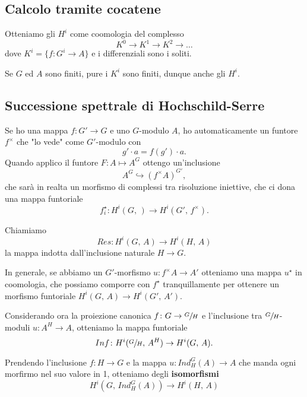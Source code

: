 \documentclass[a4paper]{article}
\begin{document}
	\subsection{Calcolo tramite cocatene}
	\begin{theorem}
		Otteniamo gli $ H^i $ come coomologia del complesso
		\[ K^0 \to K^1 \to K^2 \to \dots \]
		dove $ K^i = \{ f \colon G^i \to A \} $ e i differenziali sono i soliti.
	\end{theorem}

	\begin{theorem}
		Se $ G $ ed $ A $ sono finiti, pure i $ K^i $ sono finiti, dunque anche gli $ H^i. $
	\end{theorem}
	
	\subsection{Successione spettrale di Hochschild-Serre}
	Se ho una mappa $ f \colon G' \to G $ e uno $ G $-modulo $ A $, ho automaticamente un funtore $ f^\times $ che "lo vede" come $ G' $-modulo con
	\[ g' \cdot a = f(g') \cdot a. \]
	Quando applico il funtore $ F \colon A \mapsto A^G $ ottengo un'inclusione
	\[ A^G \hookrightarrow (f^\times A)^{G'}, \]
	che sarà in realta un morfismo di complessi tra risoluzione iniettive, che ci dona una mappa funtoriale $$  f_i^\star \colon H^i(G, \, ) \to H^i(G', \, f^\times ).  $$
	
	\begin{definition}[Restrizione]
		Chiamiamo $$  Res \colon H^i(G, \, A) \to H^i(H, \, A)  $$ la mappa indotta dall'inclusione naturale $ H \to G $.
	\end{definition}

	In generale, se abbiamo un $ G' $-morfismo $ u \colon f^\times A \to A'  $ otteniamo una mappa $ u^\star $ in coomologia, che possiamo comporre con $ f^\star $ tranquillamente per ottenere un morfismo funtoriale $ H^i(G, \, A) \to H^i(G', \, A') $.
	
	\begin{definition}[Inflazione]
		Considerando ora la proiezione canonica $ f \colon G \to \sfrac{G}{H} $ e l'inclusione tra $ \sfrac{G}{H} $-moduli $ u \colon A^H \to A $, otteniamo la mappa funtoriale \[ Inf \colon H^i(\sfrac{G}{H}, \, A^H) \to H^i(G, \, A). \]
	\end{definition}
	
	\begin{theorem}
		Prendendo l'inclusione $ f \colon H \to G $ e la mappa $ u \colon Ind_H^G(A) \to A $ che manda ogni morfirmo nel suo valore in 1, otteniamo degli \textbf{isomorfismi} \[ H^i(G, \, Ind_H^G(A)) \to H^i(H, \, A) \]
	\end{theorem}
\end{document}
